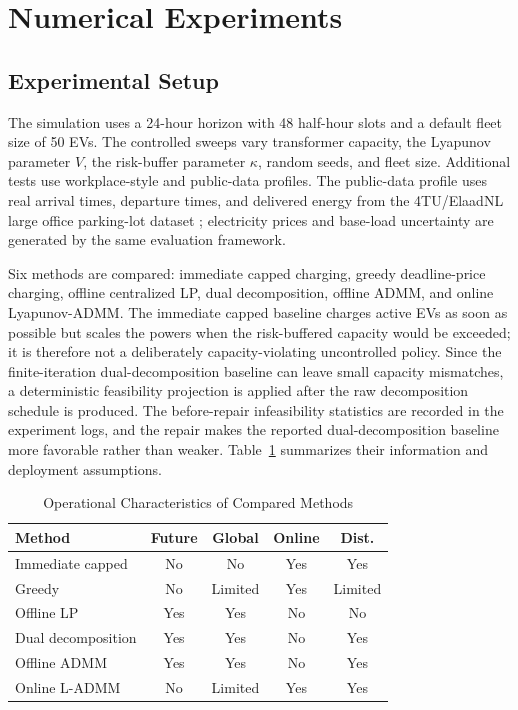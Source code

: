 \documentclass[journal]{IEEEtran}
\begin{document}
\section{Numerical Experiments}
\subsection{Experimental Setup}
The simulation uses a 24-hour horizon with 48 half-hour slots and a default fleet size of 50 EVs. The controlled sweeps vary transformer capacity, the Lyapunov parameter $V$, the risk-buffer parameter $\kappa$, random seeds, and fleet size. Additional tests use workplace-style and public-data profiles. The public-data profile uses real arrival times, departure times, and delivered energy from the 4TU/ElaadNL large office parking-lot dataset \cite{DeBont2025ElaadOffice}; electricity prices and base-load uncertainty are generated by the same evaluation framework.

Six methods are compared: immediate capped charging, greedy deadline-price charging, offline centralized LP, dual decomposition, offline ADMM, and online Lyapunov-ADMM. The immediate capped baseline charges active EVs as soon as possible but scales the powers when the risk-buffered capacity would be exceeded; it is therefore not a deliberately capacity-violating uncontrolled policy. Since the finite-iteration dual-decomposition baseline can leave small capacity mismatches, a deterministic feasibility projection is applied after the raw decomposition schedule is produced. The before-repair infeasibility statistics are recorded in the experiment logs, and the repair makes the reported dual-decomposition baseline more favorable rather than weaker. Table~\ref{tab:method_attr} summarizes their information and deployment assumptions.

\begin{table}[!t]
\centering
\caption{Operational Characteristics of Compared Methods}
\label{tab:method_attr}
\begin{tabular}{lcccc}
\toprule
Method & Future & Global & Online & Dist. \\
\midrule
Immediate capped & No & No & Yes & Yes \\
Greedy & No & Limited & Yes & Limited \\
Offline LP & Yes & Yes & No & No \\
Dual decomposition & Yes & Yes & No & Yes \\
Offline ADMM & Yes & Yes & No & Yes \\
Online L-ADMM & No & Limited & Yes & Yes \\
\bottomrule
\end{tabular}
\end{table}
\end{document}
